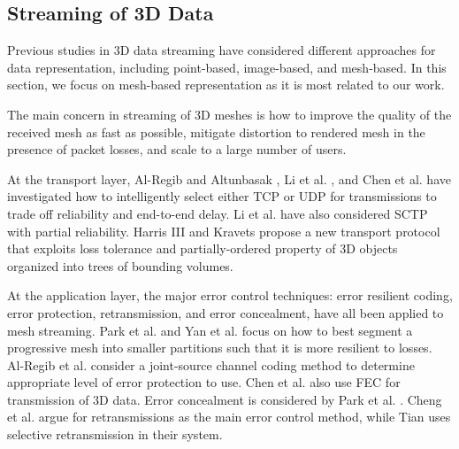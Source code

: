 \subsection{Streaming of 3D Data}

Previous studies in 3D data streaming have considered different
approaches for data representation,
including point-based, image-based, 
and mesh-based.  In this section, we focus on mesh-based representation 
as it is most related to our work.

The main concern in streaming of 3D meshes is 
how to improve the quality of the received mesh as fast as possible, 
mitigate distortion to rendered mesh in the presence of packet losses,
and scale to a large number of users.

At the transport layer, Al-Regib and Altunbasak \cite{3tpregib}, Li
et al. \cite{Li2006}, and Chen et al. \cite{chen05hybrid} have
investigated how to intelligently select either TCP or UDP for
transmissions to trade off reliability and end-to-end delay.  Li et
al. have also considered SCTP with partial reliability.
Harris III and Kravets \cite{harris:design} propose a new
transport protocol that exploits loss tolerance and
partially-ordered property of 3D objects organized into trees of
bounding volumes.

At the application layer, the major error control techniques: error
resilient coding, error protection, retransmission, and error
concealment, have all been applied to mesh streaming.  Park et al.
\cite{error:Park} and Yan et al. \cite{error:Yan} focus on how to best
segment a progressive mesh into smaller partitions such that it is
more resilient to losses.  Al-Regib et al. \cite{1061349} consider a
joint-source channel coding method to determine appropriate level of
error protection to use.  Chen et al. \cite{chen05hybrid} also use
FEC for transmission of 3D data.  Error concealment is considered by
Park et al. \cite{Park2003}.  Cheng et al. \cite{cheng07analytical}
argue for retransmissions as the main error control method, while
Tian \cite{Tian2006} uses selective retransmission in their system.

